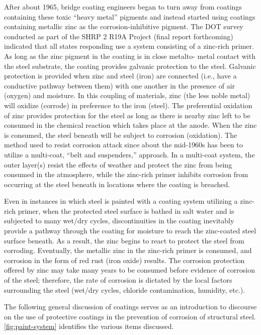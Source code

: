 After about 1965, bridge coating engineers began to turn away from coatings containing these toxic “heavy
metal” pigments and instead started using coatings containing metallic zinc as the corrosion-inhibitive pigment. The
DOT survey conducted as part of the SHRP 2 R19A Project (final report forthcoming) indicated that all states
responding use a system consisting of a zinc-rich primer. As long as the zinc pigment in the coating is in close metalto-
metal contact with the steel substrate, the coating provides galvanic protection to the steel. Galvanic protection is
provided when zinc and steel (iron) are connected (i.e., have a conductive pathway between them) with one another in the presence of air (oxygen) and moisture. In this coupling of materials, zinc (the less noble metal) will oxidize
(corrode) in preference to the iron (steel). The preferential oxidation of zinc provides protection for the steel as long
as there is nearby zinc left to be consumed in the chemical reaction which takes place at the anode. When the zinc is
consumed, the steel beneath will be subject to corrosion (oxidation). The method used to resist corrosion attack
since about the mid-1960s has been to utilize a multi-coat, “belt and suspenders,” approach. In a multi-coat system,
the outer layer(s) resist the effects of weather and protect the zinc from being consumed in the atmosphere, while the
zinc-rich primer inhibits corrosion from occurring at the steel beneath in locations where the coating is breached.

Even in instances in which steel is painted with a coating system utilizing a zinc-rich primer, when the protected
steel surface is bathed in salt water and is subjected to many wet/dry cycles, discontinuities in the coating inevitably
provide a pathway through the coating for moisture to reach the zinc-coated steel surface beneath. As a result, the
zinc begins to react to protect the steel from corroding. Eventually, the metallic zinc in the zinc-rich primer is
consumed, and corrosion in the form of red rust (iron oxide) results. The corrosion protection offered by zinc may
take many years to be consumed before evidence of corrosion of the steel; therefore, the rate of corrosion is dictated
by the local factors surrounding the steel (wet/dry cycles, chloride contamination, humidity, etc.).

The following general discussion of coatings serves as an introduction to discourse on the use of protective
coatings in the prevention of corrosion of structural steel. \cref{fig:paint-system} identifies the various items discussed.

